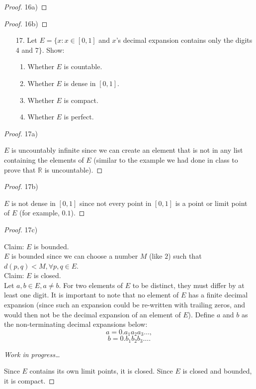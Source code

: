 \documentclass[10pt]{article}
\theoremstyle{definition}
\theoremstyle{plain}
\newcommand{\R}{\mathbb{R}}
\begin{document}
\begin{proof}
16a)


\end{proof}

\begin{proof}
16b)
\end{proof}



\pagebreak



\begin{enumerate}
\item[17.] Let $E = \{x: x\in [0,1]$ and $x$'s decimal expansion contains only the digits 4 and 7$\}$. Show:
\begin{enumerate}
\item Whether $E$ is countable.
\item Whether $E$ is dense in $[0,1]$.
\item Whether $E$ is compact.
\item Whether $E$ is perfect.
\end{enumerate}
\end{enumerate}

\begin{proof}
17a)

$E$ is uncountably infinite since we can create an element that is not in any list containing the elements of $E$ (similar to the example we had done in class to prove that $\R$ is uncountable).
\end{proof}

\begin{proof}
17b)

$E$ is not dense in $[0,1]$ since not every point in $[0,1]$ is a point or limit point of $E$ (for example, $0.1$).
\end{proof}

\begin{proof}
17c)

Claim: $E$ is bounded. \\

$E$ is bounded since we can choose a number $M$ (like $2$) such that $d(p,q) < M, \forall p,q\in E$. \\

Claim: $E$ is closed. \\

Let $a,b\in E, a\neq b$. For two elements of $E$ to be distinct, they must differ by at least one digit. It is important to note that no element of $E$ has a finite decimal expansion (since such an expansion could be re-written with trailing zeros, and would then not be the decimal expansion of an element of $E$). Define $a$ and $b$ as the non-terminating decimal expansions below:
$$a = 0.a_1a_2a_3\dots,$$
$$b=0.b_1b_2b_3\dots.$$

\textit{Work in progress\dots}

Since $E$ contains its own limit points, it is closed. Since $E$ is closed and bounded, it is compact.
\end{proof}
\end{document}
